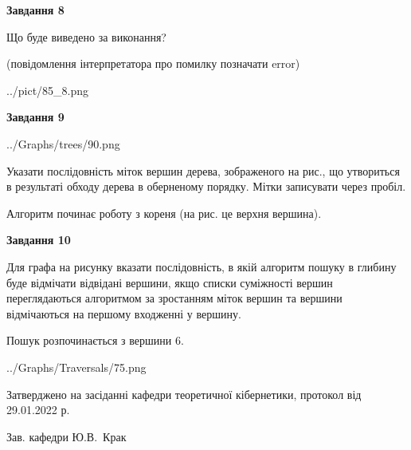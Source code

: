 \documentclass[12pt, ukrainian]{article}
\begin{document}
{\begin {large}
{\begin {center}\textbf{Завдання 8}\end {center}}\par
Що буде виведено за виконання?\par
 (повідомлення інтерпретатора про помилку позначати error)\par
\begin{center}
	{../pict/85_8.png}
\end{center}
\newpage

{\begin {center}\textbf{Завдання 9}\end {center}}\par

\begin{center}
	{../Graphs/trees/90.png}
\end{center}
Указати послідовність міток вершин дерева, зображеного на рис., що утвориться в результаті обходу дерева в оберненому порядку. Мітки записувати через пробіл.\par Алгоритм починає роботу з кореня (на рис. це верхня вершина).\par
\newpage

{\begin {center}\textbf{Завдання 10}\end {center}}\par
Для графа на рисунку вказати послідовність, в якій алгоритм пошуку в глибину буде відмічати відвідані вершини, якщо списки суміжності вершин переглядаються алгоритмом за зростанням міток вершин та вершини відмічаються на першому вход\-женні у вершину.\par
Пошук розпочинається з вершини 6.\par

\begin{center}
	{../Graphs/Traversals/75.png}
\end{center}\par
\newpage


\end {large}
}
{\smallskip \begin {small} Затверджено на засіданні кафедри теоретичної кібернетики, протокол  від   29.01.2022 р.\par\smallskip\smallskip
{\parbox {6.5 cm}{Зав. кафедри \dotfill Ю.В.~Крак}} \end{small}}
\end{document}
